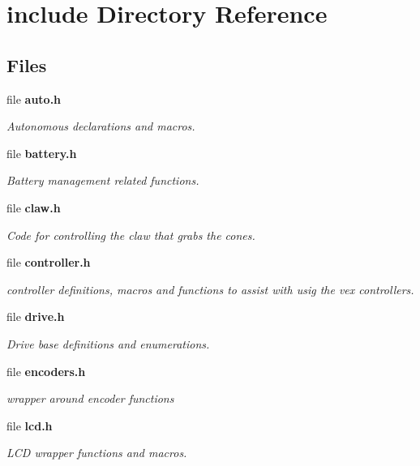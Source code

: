 \section{include Directory Reference}
\label{dir_d44c64559bbebec7f509842c48db8b23}
\subsection*{Files}
\begin{DoxyCompactItemize}
\item 
file \textbf{ auto.\+h}
\begin{DoxyCompactList}\small\item\em Autonomous declarations and macros. \end{DoxyCompactList}\item 
file \textbf{ battery.\+h}
\begin{DoxyCompactList}\small\item\em Battery management related functions. \end{DoxyCompactList}\item 
file \textbf{ claw.\+h}
\begin{DoxyCompactList}\small\item\em Code for controlling the claw that grabs the cones. \end{DoxyCompactList}\item 
file \textbf{ controller.\+h}
\begin{DoxyCompactList}\small\item\em controller definitions, macros and functions to assist with usig the vex controllers. \end{DoxyCompactList}\item 
file \textbf{ drive.\+h}
\begin{DoxyCompactList}\small\item\em Drive base definitions and enumerations. \end{DoxyCompactList}\item 
file \textbf{ encoders.\+h}
\begin{DoxyCompactList}\small\item\em wrapper around encoder functions \end{DoxyCompactList}\item 
file \textbf{ lcd.\+h}
\begin{DoxyCompactList}\small\item\em L\+CD wrapper functions and macros. \end{DoxyCompactList}\item 

\end{DoxyCompactItemize}
